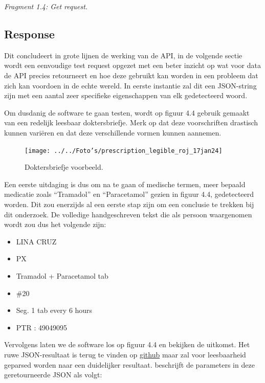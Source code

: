
\textit{Fragment 1.4: Get request.}

\subsection{Response}
Dit concludeert in grote lijnen de werking van de API, in de volgende sectie wordt een eenvoudige test request opgezet met een beter inzicht op wat voor data de API precies retourneert en hoe deze gebruikt kan worden in een probleem dat zich kan voordoen in de echte wereld. In eerste instantie zal dit een JSON-string zijn met een aantal zeer specifieke eigenschappen van elk gedetecteerd woord. 

Om dusdanig de software te gaan testen, wordt op figuur 4.4 gebruik gemaakt van een redelijk leesbaar doktersbriefje. Merk op dat deze voorschriften drastisch kunnen variëren en dat deze verschillende vormen kunnen aannemen.  
\begin{figure}
	\newpage
	\texttt{[image: ../../Foto's/prescription\_legible\_roj\_17jan24]}
	\captionsetup{justification=centering,margin=2cm}
	\caption{Doktersbriefje voorbeeld. \cite{Joson2017}}
	\centering
\end{figure}


Een eerste uitdaging is dus om na te gaan of medische termen, meer bepaald medicatie zoals “Tramadol” en “Paracetamol” gezien in figuur 4.4, gedetecteerd worden. Dit zou enerzijds al een eerste stap zijn om een conclusie te trekken bij dit onderzoek. De volledige handgeschreven tekst die als persoon waargenomen wordt zou dus het volgende zijn:

\begin{itemize}
\item LINA CRUZ 
\item PX
\item Tramadol + Paracetamol tab 
\item  \#20 
\item Seg. 1 tab every 6 hours 
\item PTR : 49049095 
\end{itemize}

Vervolgens laten we de software los op figuur 4.4 en bekijken de uitkomst. Het ruwe JSON-resultaat is terug te vinden op \href{https://github.com/Helmidyh/HD\_Bachelorscriptie\_Software\_2020}{github} maar zal voor leesbaarheid geparsed worden naar een duidelijker resultaat. \cite{Microsoft2017} beschrijft de parameters in deze geretourneerde JSON als volgt: 

